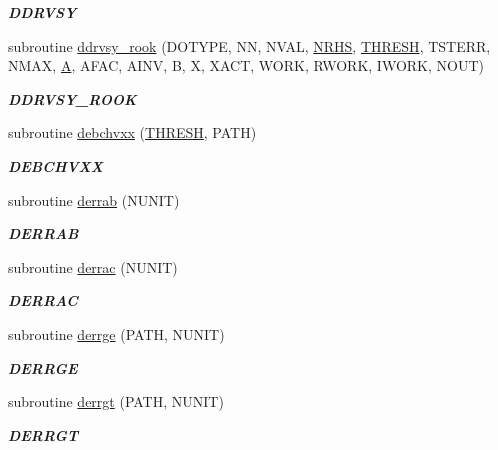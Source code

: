 \begin{DoxyCompactItemize}
\begin{DoxyCompactList}\small\item\em {\bfseries D\+D\+R\+V\+S\+Y} \end{DoxyCompactList}\item 
subroutine \hyperlink{group__double__lin_gab88584b73cf157e614b255cbe6c2d710}{ddrvsy\+\_\+rook} (D\+O\+T\+Y\+P\+E, N\+N, N\+V\+A\+L, \hyperlink{example__user_8c_aa0138da002ce2a90360df2f521eb3198}{N\+R\+H\+S}, \hyperlink{zlaqgs_8c_a0656018abfc9fa2821827415f5d5ea57}{T\+H\+R\+E\+S\+H}, T\+S\+T\+E\+R\+R, N\+M\+A\+X, \hyperlink{classA}{A}, A\+F\+A\+C, A\+I\+N\+V, B, X, X\+A\+C\+T, W\+O\+R\+K, R\+W\+O\+R\+K, I\+W\+O\+R\+K, N\+O\+U\+T)
\begin{DoxyCompactList}\small\item\em {\bfseries D\+D\+R\+V\+S\+Y\+\_\+\+R\+O\+O\+K} \end{DoxyCompactList}\item 
subroutine \hyperlink{group__double__lin_gad92e7ab1396e44f94e174a8dd762391e}{debchvxx} (\hyperlink{zlaqgs_8c_a0656018abfc9fa2821827415f5d5ea57}{T\+H\+R\+E\+S\+H}, P\+A\+T\+H)
\begin{DoxyCompactList}\small\item\em {\bfseries D\+E\+B\+C\+H\+V\+X\+X} \end{DoxyCompactList}\item 
subroutine \hyperlink{group__double__lin_gab167d767bef7d59533113fa5e1dc2ddf}{derrab} (N\+U\+N\+I\+T)
\begin{DoxyCompactList}\small\item\em {\bfseries D\+E\+R\+R\+A\+B} \end{DoxyCompactList}\item 
subroutine \hyperlink{group__double__lin_ga668ad472fc12d63dd57d3266e471c2cd}{derrac} (N\+U\+N\+I\+T)
\begin{DoxyCompactList}\small\item\em {\bfseries D\+E\+R\+R\+A\+C} \end{DoxyCompactList}\item 
subroutine \hyperlink{group__double__lin_gac2365623900bd8ef7db3f8f6d49ef939}{derrge} (P\+A\+T\+H, N\+U\+N\+I\+T)
\begin{DoxyCompactList}\small\item\em {\bfseries D\+E\+R\+R\+G\+E} \end{DoxyCompactList}\item 
subroutine \hyperlink{group__double__lin_ga767f2693dc4fd048850acdc73c6345ca}{derrgt} (P\+A\+T\+H, N\+U\+N\+I\+T)
\begin{DoxyCompactList}\small\item\em {\bfseries D\+E\+R\+R\+G\+T} \end{DoxyCompactList}\item 

\end{DoxyCompactItemize}
